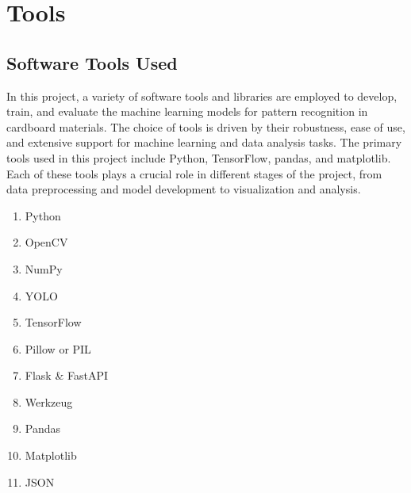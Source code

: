 \renewcommand\lstlistingname{Source Code}
\renewcommand\lstlistlistingname{Source Code}



\chapter{Tools}
\label{c:tools}
\section{Software Tools Used}

In this project, a variety of software tools and libraries are employed to develop, train, and evaluate the machine learning models for pattern recognition in cardboard materials. The choice of tools is driven by their robustness, ease of use, and extensive support for machine learning and data analysis tasks. The primary tools used in this project include Python, TensorFlow, pandas, and matplotlib. Each of these tools plays a crucial role in different stages of the project, from data preprocessing and model development to visualization and analysis.

\begin{enumerate}
	\item Python
	\item OpenCV
	\item NumPy
	\item YOLO
    \item TensorFlow
	\item Pillow or PIL
	\item Flask \& FastAPI
	\item Werkzeug
	\item Pandas
	\item Matplotlib
	\item JSON
\end{enumerate}

